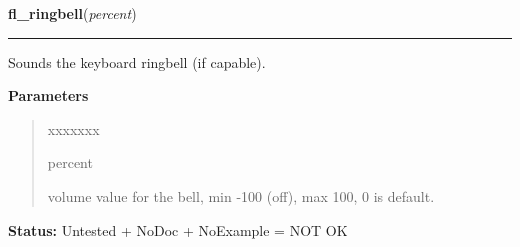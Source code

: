     \label{xformslib:library:fl_ringbell}

    \vspace{0.5ex}

\hspace{.8\funcindent}\begin{boxedminipage}{\funcwidth}

    \raggedright \textbf{fl\_ringbell}(\textit{percent})

    \vspace{-1.5ex}

    \rule{\textwidth}{0.5\fboxrule}
\setlength{\parskip}{2ex}
    Sounds the keyboard ringbell (if capable).

\setlength{\parskip}{1ex}
      \textbf{Parameters}
      \vspace{-1ex}

      \begin{quote}
        \begin{Ventry}{xxxxxxx}

          \item[percent]

          volume value for the bell, min -100 (off), max  100, 0 is 
          default.

        \end{Ventry}

      \end{quote}

\textbf{Status:} Untested + NoDoc + NoExample = NOT OK



    \end{boxedminipage}

    \label{xformslib:library:fl_gettime}

    \vspace{0.5ex}

